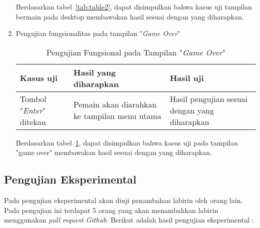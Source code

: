 \begin{enumerate}
	Berdasarkan tabel~\ref{tab:table2}, dapat disimpulkan bahwa kasus uji tampilan bermain pada desktop membawakan hasil sesuai dengan yang diharapkan. 
	
	\item Pengujian fungsionalitas pada tampilan "\textit{Game Over}" 
	
	\begin{table}[H]
		\caption{Pengujian Fungsional pada Tampilan "\textit{Game Over}"} \label{tab:table3}
		\begin{tabular}{| m{4cm} | m{6cm}  | m{4cm} |}
			\hline
			Kasus uji & Hasil yang diharapkan & Hasil uji \\ \hline
			Tombol "\textit{Enter}" ditekan & Pemain akan diarahkan ke tampilan menu utama & Hasil pengujian sesuai dengan yang diharapkan\\ \hline
		\end{tabular}
	\end{table}
	
	Berdasarkan tabel~\ref{tab:table3}, dapat disimpulkan bahwa kasus uji pada tampilan "game over" membawakan hasil sesuai dengan yang diharapkan. 
\end{enumerate}

\subsection{Pengujian Eksperimental}
Pada pengujian eksperimental akan diuji penambahan labirin oleh orang lain. Pada pengujian ini terdapat 5 orang yang akan menambahkan labirin menggunakan \textit{pull request Github}. Berikut adalah hasil pengujian eksperimental : 

